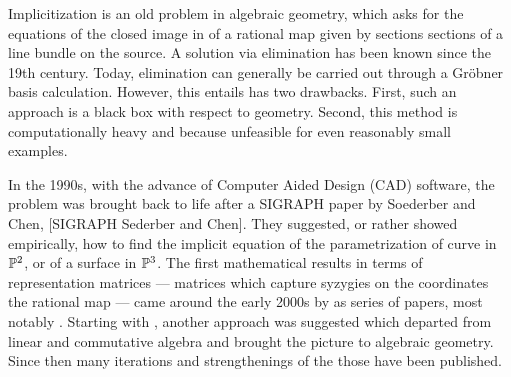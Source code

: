\documentclass[fleqn,reqno]{amsart}
\numberwithin{first}{chapter}
\begin{document}

Implicitization is an old problem in algebraic geometry,
which asks for the equations of the closed image in of a rational map
given by sections sections of a line bundle on the source.
A solution via elimination has been known since the 19th century.
Today, elimination can generally be carried out through a Gr\"obner basis calculation.
However, this entails has two drawbacks.
First, such an approach is a black box with respect to geometry.
Second, this method is computationally heavy and because unfeasible for even reasonably
small examples.

In the 1990s, with the advance of Computer Aided Design (CAD) software,
the problem was brought back to life after a SIGRAPH paper by Soederber and Chen,
[SIGRAPH Sederber and Chen].
They suggested, or rather showed empirically, how to find the implicit equation 
of the parametrization of curve in $\mathbb{P}^2$, or of a surface in $\mathbb{P}^3$.
The first mathematical results in terms of representation matrices ---
matrices which capture syzygies on the coordinates the rational map ---
came around the early 2000s by as series of papers, most notably \citet{CGZ-00}.
Starting with \citet{BJ-03}, another approach was suggested which departed from
linear and commutative algebra and brought the picture to algebraic geometry.
Since then many iterations and strengthenings of the those have been published.





\end{document}
